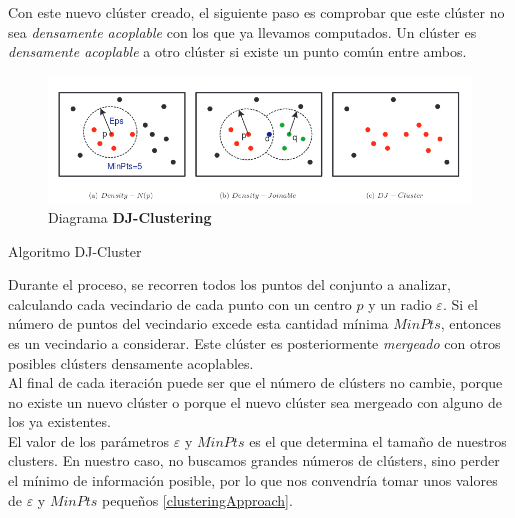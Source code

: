 \documentclass[a4paper, 12pt]{article}
\begin{document}
Con este nuevo cl\'uster creado, el siguiente paso es comprobar que este cl\'uster no sea \textit{densamente acoplable} con los que ya llevamos computados. Un cl\'uster es \textit{densamente acoplable} a otro cl\'uster si existe un punto com\'un entre ambos. \\

\begin{figure}[H]
\centering
	\includegraphics[scale=.7]{djcluster.png}
\caption{Diagrama \textbf{DJ-Clustering}}
\end{figure}

\begin{algorithm}[!htbp]\label{djCluster}
\begin{algorithmic}[1]
		\Else
		\EndIf
	\EndFor
\end{algorithmic}
\caption{\label{alg:djcluster} Algoritmo DJ-Cluster}
\end{algorithm}

Durante el proceso, se recorren todos los puntos del conjunto a analizar, calculando cada vecindario de cada punto con un centro $p$ y un radio $\varepsilon$. Si el n\'umero de puntos del vecindario excede esta cantidad m\'inima $MinPts$, entonces es un vecindario a considerar. Este cl\'uster es posteriormente \textit{mergeado} con otros posibles cl\'usters densamente acoplables. \\

Al final de cada iteraci\'on puede ser que el n\'umero de cl\'usters no cambie, porque no existe un nuevo cl\'uster o porque el nuevo cl\'uster sea mergeado con alguno de los ya existentes.\\

El valor de los par\'ametros $\varepsilon$ y $MinPts$ es el que determina el tama\~no de nuestros clusters. En nuestro caso, no buscamos grandes n\'umeros de cl\'usters, sino perder el m\'inimo de informaci\'on posible, por lo que nos convendr\'ia tomar unos valores de $\varepsilon$ y $MinPts$ peque\~nos \ref{clusteringApproach}.\\
\end{document}
